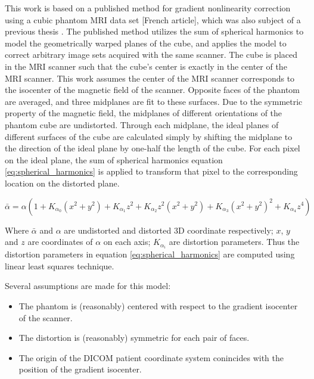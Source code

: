 This work is based on a published method for gradient nonlinearity correction using a cubic phantom MRI data set [French article], which was also subject of a previous thesis \cite{tom}.
The published method utilizes the sum of spherical
harmonics to model the geometrically warped planes of the cube, and applies the model
to correct arbitrary image sets acquired with the same scanner. The cube is
placed in the MRI scanner such that the cube's center is exactly in the center of the MRI scanner.  This work assumes the center of the MRI scanner corresponds to the isocenter of the
magnetic field of the scanner. Opposite faces of the phantom are averaged, and three midplanes are fit to these surfaces.  Due to the symmetric property of the magnetic field,
the midplanes of different orientations of the phantom cube are undistorted.  Through each midplane, the ideal planes of different surfaces
of the cube are calculated simply by shifting the midplane to the direction
of the ideal plane by one-half the length of the cube. For each pixel on
the ideal plane, the sum of spherical
harmonics equation \ref{eq:spherical_harmonics} is applied to transform that pixel to the corresponding location on the distorted plane.

\begin{equation} \label{eq:spherical_harmonics}
\bar{\alpha} = \alpha(1 + K_{\alpha_0}(x^2 + y^2) + K_{\alpha_1}z^2 +
K_{\alpha_2}z^2(x^2 + y^2) + K_{\alpha_3}(x^2 + y^2)^2 +
K_{\alpha_4}z^4)
\end{equation}

Where $\bar{\alpha}$ and $\alpha$ are undistorted and distorted 3D coordinate respectively; $x$, $y$ and $z$ are coordinates of $\alpha$ on each axis; $K_{\alpha_i}$ are distortion parameters. Thus the distortion parameters in
equation \ref{eq:spherical_harmonics} are computed using linear least squares
technique.

Several assumptions are made for this model:
\begin{itemize}
  \item The phantom is (reasonably) centered with respect to the gradient isocenter of the scanner.
  \item The distortion is (reasonably) symmetric for each pair of faces.
  \item The origin of the DICOM patient coordinate system conincides with the position of the gradient 
    isocenter.
\end{itemize}


